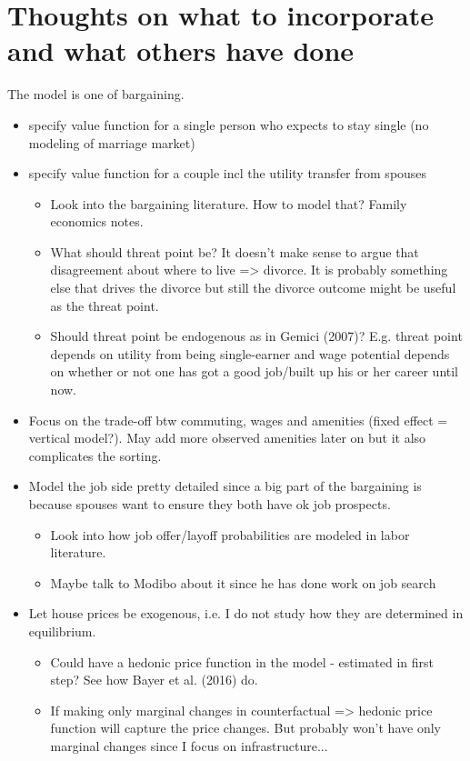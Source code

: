 \section{Thoughts on what to incorporate and what others have done}
The model is one of bargaining.
\begin{itemize}
\item specify value function for a single person who expects to stay single (no modeling of marriage market)
\item specify value function for a couple incl the utility transfer from spouses
\begin{itemize}
\item Look into the bargaining literature. How to model that? Family economics notes.
\item What should threat point be? It doesn't make sense to argue that disagreement about where to live => divorce. It is probably something else that drives the divorce but still the divorce outcome might be useful as the threat point.
\item Should threat point be endogenous as in Gemici (2007)? E.g. threat point depends on utility from being single-earner and wage potential depends on whether or not one has got a good job/built up his or her career until now.
\end{itemize}
\item Focus on the trade-off btw commuting, wages and amenities (fixed effect = vertical model?). May add more observed amenities later on but it also complicates the sorting.
\item Model the job side pretty detailed since a big part of the bargaining is because spouses want to ensure they both have ok job prospects.
\begin{itemize}
\item Look into how job offer/layoff probabilities are modeled in labor literature.
\item Maybe talk to Modibo about it since he has done work on job search
\end{itemize}
\item Let house prices be exogenous, i.e. I do not study how they are determined in equilibrium. 
\begin{itemize}
\item Could have a hedonic price function in the model - estimated in first step? See how Bayer et al. (2016) do. 
\item If making only marginal changes in counterfactual => hedonic price function will capture the price changes. But probably won't have only marginal changes since I focus on infrastructure...

\end{itemize}
\end{itemize}
